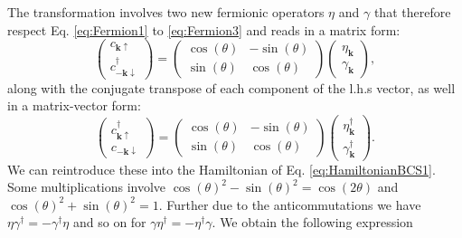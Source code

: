 \documentclass[../main.tex]{subfile}
\begin{document}
The transformation involves two new fermionic operators $\eta$ and $\gamma$ that therefore respect Eq. \ref{eq:Fermion1} to \ref{eq:Fermion3} and reads in a matrix form:
\begin{equation}\label{eq:RotationBasis_c1}
    \begin{pmatrix}
        c_{\bm{k}\uparrow}\\
        c_{-\bm{k}\downarrow}^{\dagger}
    \end{pmatrix} = 
    \begin{pmatrix}
        \cos(\theta) & -\sin(\theta)\\
        \sin(\theta) & \cos(\theta)
    \end{pmatrix}
    \begin{pmatrix}
        \eta_{\bm{k}}\\
        \gamma_{\bm{k}}
    \end{pmatrix},
\end{equation}
along with the conjugate transpose of each component of the l.h.s vector, as well in a matrix-vector form:
\begin{equation}\label{eq:RotationBasis_c2}
    \begin{pmatrix}
        c_{\bm{k}\uparrow}^{\dagger} \\
        c_{-\bm{k}\downarrow}
    \end{pmatrix} = 
    \begin{pmatrix}
        \cos(\theta) & -\sin(\theta)\\
        \sin(\theta) & \cos(\theta)
    \end{pmatrix}
    \begin{pmatrix}
        \eta_{\bm{k}}^{\dagger} \\
        \gamma_{\bm{k}}^{\dagger}
    \end{pmatrix}.
\end{equation}
We can reintroduce these into the Hamiltonian of Eq. \ref{eq:HamiltonianBCS1}. 
Some multiplications involve $\cos(\theta)^2 - \sin(\theta)^2 = \cos(2\theta)$ and $\cos(\theta)^2 + \sin(\theta)^2 = 1$. 
Further due to the anticommutations we have $\eta \gamma^{\dagger} = - \gamma^{\dagger}\eta$ and so on for $\gamma \eta^{\dagger} = - \eta^{\dagger}\gamma$.
We obtain the following expression
\end{document}
